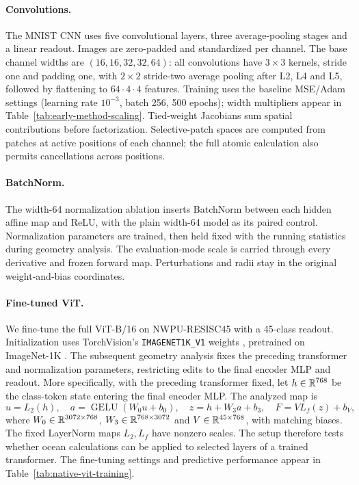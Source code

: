 \paragraph{Convolutions.}
The MNIST CNN uses five convolutional layers, three average-pooling stages and a linear readout. Images are zero-padded and standardized per channel. The base channel widths are $(16,16,32,32,64)$: all convolutions have $3\times3$ kernels, stride one and padding one, with $2\times2$ stride-two average pooling after L2, L4 and L5, followed by flattening to $64\cdot4\cdot4$ features. Training uses the baseline MSE/Adam settings (learning rate $10^{-3}$, batch 256, 500 epochs); width multipliers appear in Table~\ref{tab:early-method-scaling}. Tied-weight Jacobians sum spatial contributions before factorization. Selective-patch spaces are computed from patches at active positions of each channel; the full atomic calculation also permits cancellations across positions.

\paragraph{BatchNorm.}
The width-64 normalization ablation inserts BatchNorm between each hidden affine map and ReLU, with the plain width-64 model as its paired control. Normalization parameters are trained, then held fixed with the running statistics during geometry analysis. The evaluation-mode scale is carried through every derivative and frozen forward map. Perturbations and radii stay in the original weight-and-bias coordinates.

\paragraph{Fine-tuned ViT.}\label{app:methods-vit}
We fine-tune the full ViT-B/16 \citep{dosovitskiy2021vit} on NWPU-RESISC45 \citep{cheng2017resisc} with a 45-class readout. Initialization uses TorchVision's \texttt{IMAGENET1K\_V1} weights \citep{torchvision}, pretrained on ImageNet-1K \citep{deng2009imagenet}. The subsequent geometry analysis fixes the preceding transformer and normalization parameters, restricting edits to the final encoder MLP and readout. More specifically, with the preceding transformer fixed, let $h\in\mathbb R^{768}$ be the class-token state entering the final encoder MLP. The analyzed map is
\[
 u=L_2(h),\quad a=\operatorname{GELU}(W_0u+b_0),\quad
 z=h+W_3a+b_3,\quad F=V L_f(z)+b_V,
\]
where $W_0\in\mathbb R^{3072\times768}$, $W_3\in\mathbb R^{768\times3072}$ and $V\in\mathbb R^{45\times768}$, with matching biases. The fixed LayerNorm maps $L_2,L_f$ have nonzero scales. The setup therefore tests whether ocean calculations can be applied to selected layers of a trained transformer. The fine-tuning settings and predictive performance appear in Table~\ref{tab:native-vit-training}. 

